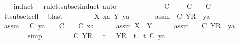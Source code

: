 \begin{isabellebody}
\ \ \isamarkupfalse%
\ {\isacharparenleft}induct\ {\isasymrho}\ {\isasymsigma}\ rule{\isacharcolon}tt{\isacharunderscore}subset{\isachardot}induct{\isacharcomma}\ auto{\isacharparenright}\isanewline
\ \ \ \ \isamarkupfalse%
\ {\isasymsigma}{\isacharprime}\isanewline
\ \ \ \ \isamarkupfalse%
\ {\isachardoublequoteopen}{\isasymsigma}{\isacharprime}\ {\isasymle}\isactrlsub C\ {\isacharbrackleft}{\isacharbrackright}\ {\isasymLongrightarrow}\ {\isasymexists}{\isasymrho}{\isacharprime}{\isachardot}\ {\isasymrho}{\isacharprime}\ {\isasymsubseteq}\isactrlsub C\ {\isasymsigma}{\isacharprime}\ {\isasymand}\ {\isasymrho}{\isacharprime}\ {\isasymle}\isactrlsub C\ {\isacharbrackleft}{\isacharbrackright}{\isachardoublequoteclose}\isanewline
\ \ \ \ \ \ \isamarkupfalse%
\ tt{\isacharunderscore}subset{\isacharunderscore}refl\ \isamarkupfalse%
\ blast\isanewline
\ \ \isamarkupfalse%
\isanewline
\ \ \ \ \isamarkupfalse%
\ X\ xa\ Y\ ya\ {\isasymsigma}{\isacharprime}\isanewline
\ \ \ \ \isamarkupfalse%
\ assm{}{\isacharcolon}\ {\isachardoublequoteopen}{\isasymsigma}{\isacharprime}\ {\isasymle}\isactrlsub C\ {\isacharbrackleft}Y{\isacharbrackright}\isactrlsub R\ {\isacharhash}\ ya{\isachardoublequoteclose}\isanewline
\ \ \ \ \isamarkupfalse%
\ assm{}{\isacharcolon}\ {\isachardoublequoteopen}{\isacharparenleft}{\isasymAnd}{\isasymsigma}{\isacharprime}{\isachardot}\ {\isasymsigma}{\isacharprime}\ {\isasymle}\isactrlsub C\ ya\ {\isasymLongrightarrow}\ {\isasymexists}{\isasymrho}{\isacharprime}{\isachardot}\ {\isasymrho}{\isacharprime}\ {\isasymsubseteq}\isactrlsub C\ {\isasymsigma}{\isacharprime}\ {\isasymand}\ {\isasymrho}{\isacharprime}\ {\isasymle}\isactrlsub C\ xa{\isacharparenright}{\isachardoublequoteclose}\isanewline
\ \ \ \ \isamarkupfalse%
\ assm{}{\isacharcolon}\ {\isachardoublequoteopen}X\ {\isasymsubseteq}\ Y{\isachardoublequoteclose}\isanewline
\ \ \ \ \isamarkupfalse%
\ assm{}\ \isamarkupfalse%
\ {\isachardoublequoteopen}{\isasymsigma}{\isacharprime}\ {\isasymle}\isactrlsub C\ {\isacharbrackleft}{\isacharbrackleft}Y{\isacharbrackright}\isactrlsub R{\isacharbrackright}\ {\isacharat}\ ya{\isachardoublequoteclose}\isanewline
\ \ \ \ \ \ \isamarkupfalse%
\ simp\isanewline
\ \ \ \ \isamarkupfalse%
\ \isamarkupfalse%
\ {\isachardoublequoteopen}{\isasymsigma}{\isacharprime}\ {\isasymle}\isactrlsub C\ {\isacharbrackleft}{\isacharbrackleft}Y{\isacharbrackright}\isactrlsub R{\isacharbrackright}\ \ {\isasymor}\ {\isacharparenleft}{\isasymexists}t{\isacharprime}{\isachardot}\ {\isasymsigma}{\isacharprime}\ {\isacharequal}\ {\isacharbrackleft}{\isacharbrackleft}Y{\isacharbrackright}\isactrlsub R{\isacharbrackright}\ {\isacharat}\ t{\isacharprime}\ {\isasymand}\ t{\isacharprime}\ {\isasymle}\isactrlsub C\ ya{\isacharparenright}{\isachardoublequoteclose}\isanewline

\end{isabellebody}
